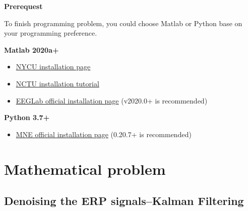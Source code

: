 \documentclass[a4 paper]{article}
\begin{document}
\noindent{\color{LightRubineRed} \rule{\linewidth}{0.1mm}}
\begin{center}
    \textbf{\large{Prerequest}}
\end{center}
To finish programming problem, you could choose Matlab or Python base on your programming preference.
\begin{multicols}{2}
\textbf{Matlab 2020a+}
\begin{itemize}
    \item \href{https://ca.nctu.edu.tw/installation/item/matlab-tah-standalone-ch}{NYCU installation page}
    \item \href{https://ca.nctu.edu.tw/manual/matlab/NCTU_MATLAB_TAH_stand_alone_installation_ch.pdf}{NCTU installation tutorial}
    \item \href{https://sccn.ucsd.edu/eeglab/downloadtoolbox.php}{EEGLab official installation page} (v2020.0+ is recommended)
\end{itemize}
\columnbreak
\textbf{Python 3.7+}
\begin{itemize}
    \item \href{https://mne.tools/stable/install/index.html}{MNE official installation page}  (0.20.7+ is recommended)
\end{itemize}
\end{multicols}
\noindent{\color{LightRubineRed} \rule{\linewidth}{0.1mm}}
\newpage
\section{Mathematical problem}
\subsection{Denoising the ERP signals--Kalman Filtering}
\end{document}
